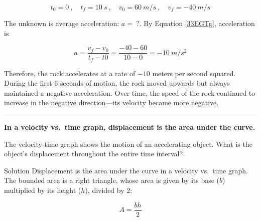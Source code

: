 \documentclass[dvipsnames]{article}
\begin{document}
\begin{equation*}
    t_0 = 0\ , \quad t_f = \SI{10}{s}\ , \quad
    v_0 = \SI{60}{m/s}\ , \quad v_f = -\SI{40}{m/s}
\end{equation*}

The unknown is average acceleration: $a =\ ?$. By Equation \eqref{33EGTg}, acceleration is

\begin{equation*}
    a = \frac{v_f - v_0}{t_f - t0} = \frac{-40-60}{10-0} = \SI{-10}{m/s^2}
\end{equation*}

Therefore, the rock accelerates at a rate of $-10$ meters per second squared. During the first 6 seconds of motion, the rock moved upwards but always maintained a negative acceleration. Over time, the speed of the rock continued to increase in the negative direction---its velocity became more negative. 

\hrule

\begin{mdframed}[backgroundcolor=black!10]
    \centering
    \textbf{In a velocity vs.~time graph, displacement is the area under the curve.}
\end{mdframed}


\begin{example}
The velocity-time graph shows the motion of an accelerating object. What is the object's displacement throughout the entire time interval?
\end{example}

\begin{center}
\end{center}

Solution Displacement is the area under the curve in a velocity vs.~time graph. The bounded area is a right triangle, whose area is given by its base ($b$) multiplied by its height ($h$), divided by 2:

\begin{equation} \label{5kz27x}
    A = \frac{b h}{2} 
\end{equation}
\end{document}
